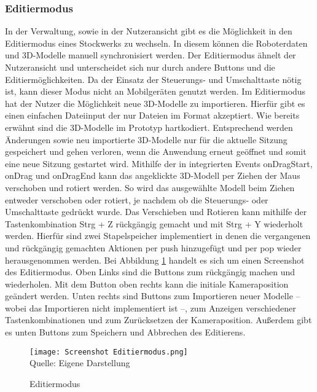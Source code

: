 \subsubsection{Editiermodus}\label{sec:EditMode}
In der Verwaltung, sowie in der Nutzeransicht gibt es die Möglichkeit in den Editiermodus eines Stockwerks zu wechseln. In diesem können die Roboterdaten und 3D-Modelle manuell synchronisiert werden. Der Editiermodus ähnelt der Nutzeransicht und unterscheidet sich nur durch andere Buttons und die Editiermöglichkeiten. Da der Einsatz der Steuerungs- und Umschalttaste nötig ist, kann dieser Modus nicht an Mobilgeräten genutzt werden. Im Editiermodus hat der Nutzer die Möglichkeit neue 3D-Modelle zu importieren. Hierfür gibt es einen einfachen Dateiinput der nur Dateien im \glb{} Format akzeptiert. Wie bereits erwähnt sind die 3D-Modelle im Prototyp hartkodiert. Entsprechend werden Änderungen sowie neu importierte 3D-Modelle nur für die aktuelle Sitzung gespeichert und gehen verloren, wenn die Anwendung erneut geöffnet und somit eine neue Sitzung gestartet wird. Mithilfe der in \deckgl{} integrierten Events onDragStart, onDrag und onDragEnd \cite{DeckglInteractivity} kann das angeklickte 3D-Modell per Ziehen der Maus verschoben und rotiert werden. So wird das ausgewählte Modell beim Ziehen entweder verschoben oder rotiert, je nachdem ob die Steuerungs- oder Umschalttaste gedrückt wurde. Das Verschieben und Rotieren kann mithilfe der Tastenkombination Strg + Z rückgängig gemacht und mit Strg + Y wiederholt werden. Hierfür sind zwei Stapelspeicher implementiert in denen die vergangenen und rückgängig gemachten Aktionen per push hinzugefügt und per pop wieder herausgenommen werden. Bei Abbildung \ref{fig:EditmodeScreenshot} handelt es sich um einen Screenshot des Editiermodus. Oben Links sind die Buttons zum rückgängig machen und wiederholen. Mit dem Button oben rechts kann die initiale Kameraposition geändert werden. Unten rechts sind Buttons zum Importieren neuer Modelle – wobei das Importieren nicht implementiert ist –, zum Anzeigen verschiedener Tastenkombinationen und zum Zurücksetzen der Kameraposition. Außerdem gibt es unten Buttons zum Speichern und Abbrechen des Editierens.

\begin{figure}[H]
    \caption{Editiermodus}\label{fig:EditmodeScreenshot}
    \texttt{[image: Screenshot Editiermodus.png]}
    \\
    Quelle: Eigene Darstellung
\end{figure}

